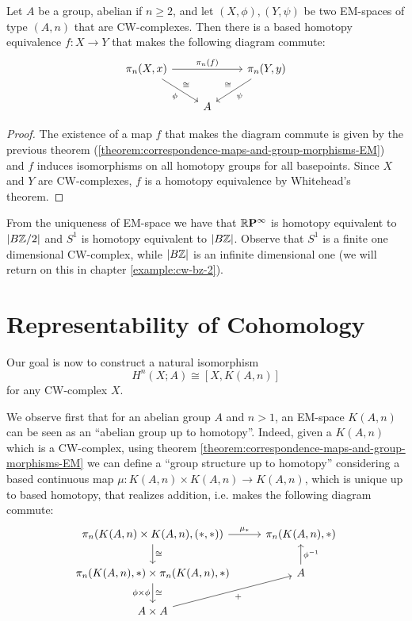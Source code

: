 \begin{corollary}
Let $A$ be a group, abelian if $n\ge2$, and let $(X,\phi), (Y,\psi)$ be two EM-spaces of type $(A,n)$ that are CW-complexes. Then there is a based homotopy equivalence $f:X\to Y$ that makes the following diagram commute:
\[
\begin{tikzcd}
\pi_n(X,x) \ar[dr,"\phi"',"\cong"] \ar[rr,"\pi_n(f)"] & & \pi_n(Y,y) \ar[dl,"\psi","\cong"']\\
& A &
\end{tikzcd}
\]
\end{corollary}

\begin{proof}
The existence of a map $f$ that makes the diagram commute is given by the previous theorem (\ref{theorem:correspondence-maps-and-group-morphisms-EM}) and $f$ induces isomorphisms on all homotopy groups for all basepoints. Since $X$ and $Y$ are CW-complexes, $f$ is a homotopy equivalence by Whitehead's theorem.
\end{proof}

\begin{example}
From the uniqueness of EM-space we have that ${{\mathbb R}\mathbf{P}^{\infty}}$ is homotopy equivalent to $|B{\mathbb Z}/2|$ and $S^1$ is homotopy equivalent to $|B{\mathbb Z}|$. Observe that $S^1$ is a finite one dimensional CW-complex, while $|B{\mathbb Z}|$ is an infinite dimensional one (we will return on this in chapter \ref{example:cw-bz-2}).
\end{example}\label{example:cw-bz-1}

\section{Representability of Cohomology}

Our goal is now to construct a natural isomorphism
\[H^n(X;A)\cong[X,K(A,n)]\]
for any CW-complex $X$.

We observe first that for an abelian group $A$ and $n>1$, an EM-space $K(A,n)$ can be seen as an \enquote{abelian group up to homotopy}. Indeed, given a $K(A,n)$ which is a CW-complex, using theorem \ref{theorem:correspondence-maps-and-group-morphisms-EM} we can define a \enquote{group structure up to homotopy} considering a based continuous map $\mu:K(A,n)\times K(A,n)\to K(A,n)$, which is unique up to based homotopy, that realizes addition, i.e. makes the following diagram commute:
\[
\begin{tikzcd}
\pi_n(K(A,n)\times K(A,n),(*,*)) \ar[d,"\cong"] \ar[r,"\mu_*"] & \pi_n(K(A,n),*)\\
\pi_n(K(A,n),*)\times \pi_n(K(A,n),*) \ar[d,"\phi\times\phi"',"\cong"] & A \ar[u,"\phi^\inv"']\\
A\times A \ar[ur,"+"'] &
\end{tikzcd}
\]

